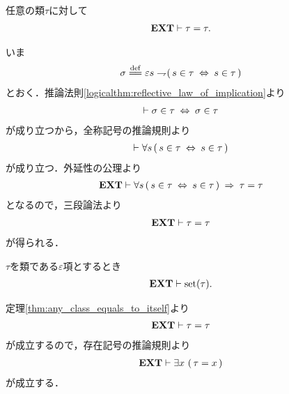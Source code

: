 	\begin{screen}
		\begin{thm}[任意の類は自分自身と等しい]\label{thm:any_class_equals_to_itself}
			任意の類$\tau$に対して
			\begin{align}
				\mbox{{\bf EXT}} \vdash \tau = \tau.
			\end{align}
		\end{thm}
	\end{screen}
	
	\begin{sketch}
		いま
		\begin{align}
			\sigma \defeq 
			\varepsilon s \negation (\, s \in \tau \lrarrow s \in \tau\, )
		\end{align}
		とおく．推論法則\ref{logicalthm:reflective_law_of_implication}より
		\begin{align}
			\vdash \sigma \in \tau \hspace{0.25em}\Leftrightarrow\hspace{0.25em} \sigma \in \tau
		\end{align}
		が成り立つから，全称記号の推論規則より
		\begin{align}
			\vdash \forall s\, (\, s \in \tau  \hspace{0.25em}\Leftrightarrow\hspace{0.25em} s \in \tau\, )
		\end{align}
		が成り立つ．外延性の公理より
		\begin{align}
			\mbox{{\bf EXT}} \vdash \forall s\, (\, s \in \tau  \hspace{0.25em}\Leftrightarrow\hspace{0.25em} s \in \tau\, )
			\hspace{0.25em}\Rightarrow\hspace{0.25em} \tau = \tau
		\end{align}
		となるので，三段論法より
		\begin{align}
			\mbox{{\bf EXT}} \vdash \tau = \tau
		\end{align}
		が得られる．
		\QED
	\end{sketch}
	
	\begin{screen}
		\begin{thm}
			$\tau$を類である$\varepsilon$項とするとき
			\begin{align}
				\mbox{{\bf EXT}} \vdash \operatorname*{set} (\tau).
			\end{align}
		\end{thm}
	\end{screen}
	
	\begin{sketch}
		定理\ref{thm:any_class_equals_to_itself}より
		\begin{align}
			\mbox{{\bf EXT}} \vdash \tau = \tau
		\end{align}
		が成立するので，存在記号の推論規則より
		\begin{align}
			\mbox{{\bf EXT}} \vdash \exists x\, \left(\, \tau = x\, \right)
		\end{align}
		が成立する．
		\QED
	\end{sketch}
	

